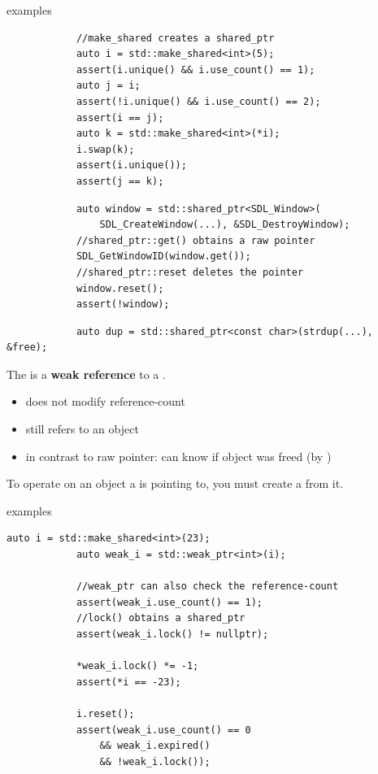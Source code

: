 	\begin{frame}[fragile]{ examples}
		\begin{lstlisting}
			//make_shared creates a shared_ptr
			auto i = std::make_shared<int>(5);
			assert(i.unique() && i.use_count() == 1);
			auto j = i;
			assert(!i.unique() && i.use_count() == 2);
			assert(i == j);
			auto k = std::make_shared<int>(*i);
			i.swap(k);
			assert(i.unique());
			assert(j == k);
		\end{lstlisting}
		
		\pause
		
		\begin{lstlisting}
			auto window = std::shared_ptr<SDL_Window>(
			    SDL_CreateWindow(...), &SDL_DestroyWindow);
			//shared_ptr::get() obtains a raw pointer
			SDL_GetWindowID(window.get());
			//shared_ptr::reset deletes the pointer
			window.reset();
			assert(!window);
		\end{lstlisting}
		
		\pause
		
		\begin{lstlisting}
			auto dup = std::shared_ptr<const char>(strdup(...), &free);
		\end{lstlisting}
	\end{frame}
	
	\begin{frame}{}
		The  is a \textbf{weak reference} to a .
		
		\begin{itemize}
			\item does not modify reference-count
			\item still refers to an object
			\pause
			\item in contrast to raw pointer: can know if object was freed (by )
		\end{itemize}
		
		\pause
		
		\emptyline
		To operate on an object a  is pointing to, you must create a  from it.
		
	\end{frame}
	
	\begin{frame}[fragile=singleslide]{ examples}
		\begin{lstlisting}[gobble=12]
			auto i = std::make_shared<int>(23);
			auto weak_i = std::weak_ptr<int>(i);
			
			//weak_ptr can also check the reference-count
			assert(weak_i.use_count() == 1);
			//lock() obtains a shared_ptr
			assert(weak_i.lock() != nullptr);
			
			*weak_i.lock() *= -1;
			assert(*i == -23);
			
			i.reset();
			assert(weak_i.use_count() == 0
			    && weak_i.expired()
			    && !weak_i.lock());
		\end{lstlisting}
	\end{frame}
	
